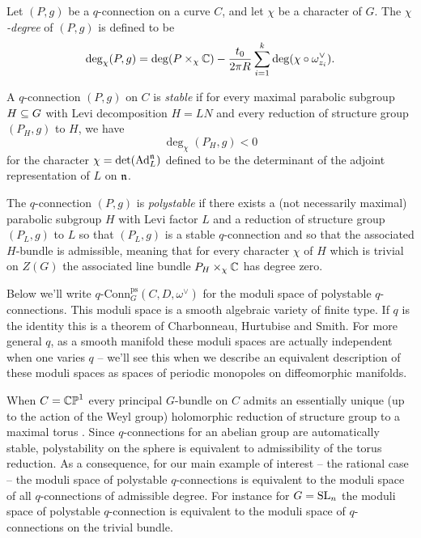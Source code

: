 \documentclass[10pt, oneside]{article}
\newcommand{\qconn}{q\text{-Conn}}
\begin{document}
\begin{definition}
Let $(P,g)$ be a $q$-connection on a curve $C$, and let $\chi$ be a character of $G$.  The \emph{$\chi$-degree} of $(P,g)$ is defined to be 
\[\deg_\chi(P,g) = \deg(P \times_\chi \mathbb{C}) - \frac {t_0}{2\pi R} \sum_{i=1}^k \deg(\chi \circ \omega^\vee_{z_i}).\]

A $q$-connection $(P,g)$ on $C$ is \emph{stable} if for every maximal parabolic subgroup $H \subseteq G$ with Levi decomposition $H = LN$ and every reduction of structure group $(P_H, g)$ to $H$, we have
\[\deg_\chi(P_H, g) < 0\]
for the character $\chi = \det(\mathrm{Ad}_L^{\mathfrak{n}})$ defined to be the determinant of the adjoint representation of $L$ on $\mathfrak{n}$.

The $q$-connection $(P,g)$ is \emph{polystable} if there exists a (not necessarily maximal) parabolic subgroup $H$ with Levi factor $L$ and a reduction of structure group $(P_L, g)$ to $L$ so that $(P_L,g)$ is a stable $q$-connection and so that the associated $H$-bundle is admissible, meaning that for every character $\chi$ of $H$ which is trivial on $Z(G)$ the associated line bundle $P_H \times_\chi \mathbb{C}$ has degree zero. 
\end{definition}

Below we'll write $\qconn_G^{\text{ps}}(C, D, \omega^\vee)$ for the moduli space of polystable $q$-connections.  This moduli space is a smooth algebraic variety of finite type.  If $q$ is the identity this is a theorem of Charbonneau, Hurtubise and Smith.  For more general $q$, as a smooth manifold these moduli spaces are actually independent when one varies $q$ -- we'll see this when we describe an equivalent description of these moduli spaces as spaces of periodic monopoles on diffeomorphic manifolds.  

When $C = \mathbb{CP}^1$ every principal $G$-bundle on $C$ admits an essentially unique (up to the action of the Weyl group) holomorphic reduction of structure group to a maximal torus \cite{GrothendieckSphere}.  Since $q$-connections for an abelian group are automatically stable, polystability on the sphere is equivalent to admissibility of the torus reduction.  As a consequence, for our main example of interest -- the rational case -- the moduli space of polystable $q$-connections is equivalent to the moduli space of all $q$-connections of admissible degree.  For instance for $G=\mathrm{SL}_n$ the moduli space of polystable $q$-connection is equivalent to the moduli space of $q$-connections on the trivial bundle.
\end{document}
